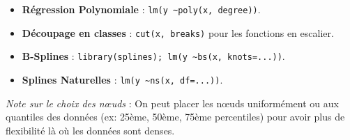 \begin{itemize}
    \item \textbf{Régression Polynomiale} : \texttt{lm(y \textasciitilde poly(x, degree))}.
    \item \textbf{Découpage en classes} : \texttt{cut(x, breaks)} pour les fonctions en escalier.
    \item \textbf{B-Splines} : \texttt{library(splines); lm(y \textasciitilde bs(x, knots=...))}.
    \item \textbf{Splines Naturelles} : \texttt{lm(y \textasciitilde ns(x, df=...))}.
\end{itemize}

\textit{Note sur le choix des nœuds} : On peut placer les nœuds uniformément ou aux quantiles des données (ex: 25ème, 50ème, 75ème percentiles) pour avoir plus de flexibilité là où les données sont denses.
